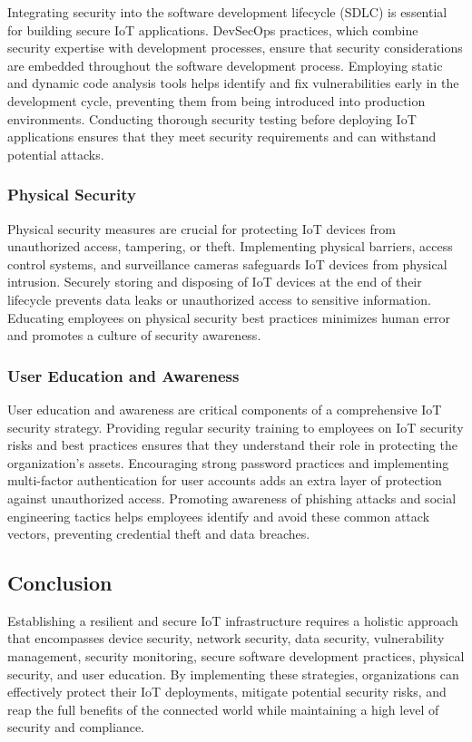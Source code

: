 \documentclass[conference]{IEEEtran}
\begin{document}
Integrating security into the software development lifecycle (SDLC) is essential for building secure IoT applications. DevSecOps practices, which combine security expertise with development processes, ensure that security considerations are embedded throughout the software development process. Employing static and dynamic code analysis tools helps identify and fix vulnerabilities early in the development cycle, preventing them from being introduced into production environments. Conducting thorough security testing before deploying IoT applications ensures that they meet security requirements and can withstand potential attacks.

\subsubsection{Physical Security}

Physical security measures are crucial for protecting IoT devices from unauthorized access, tampering, or theft. Implementing physical barriers, access control systems, and surveillance cameras safeguards IoT devices from physical intrusion. Securely storing and disposing of IoT devices at the end of their lifecycle prevents data leaks or unauthorized access to sensitive information. Educating employees on physical security best practices minimizes human error and promotes a culture of security awareness.

\subsubsection{User Education and Awareness}

User education and awareness are critical components of a comprehensive IoT security strategy. Providing regular security training to employees on IoT security risks and best practices ensures that they understand their role in protecting the organization's assets. Encouraging strong password practices and implementing multi-factor authentication for user accounts adds an extra layer of protection against unauthorized access. Promoting awareness of phishing attacks and social engineering tactics helps employees identify and avoid these common attack vectors, preventing credential theft and data breaches.

\subsection{Conclusion}

Establishing a resilient and secure IoT infrastructure requires a holistic approach that encompasses device security, network security, data security, vulnerability management, security monitoring, secure software development practices, physical security, and user education. By implementing these strategies, organizations can effectively protect their IoT deployments, mitigate potential security risks, and reap the full benefits of the connected world while maintaining a high level of security and compliance.
\end{document}
